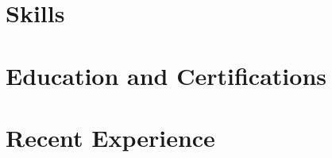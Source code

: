 \documentclass[a4paper,12pt]{article}
\begin{document}


\section{Skills}


\section{Education and Certifications}


\section{Recent Experience}


\end{document}
